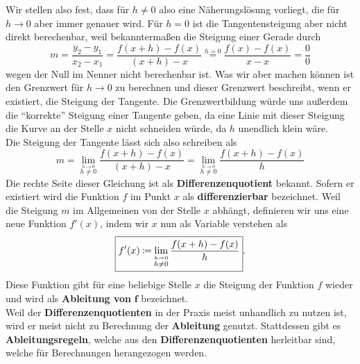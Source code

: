 \documentclass[../../main.tex]{subfiles}
\begin{document}
    Wir stellen also fest, dass für $h\neq 0$ also eine Näherungslösung vorliegt, die für $h\to 0$ aber immer genauer wird. Für $h=0$ ist die Tangentensteigung aber nicht direkt berechenbar, weil bekanntermaßen die Steigung einer Gerade durch
    \[m = \frac{y_2 - y_1}{x_2 - x_1} = \frac{f(x+h) - f(x)}{(x+h)-x} \stackrel{h=0}{=} \frac{f(x) - f(x)}{x-x} = \frac{0}{0}\]
    wegen der Null im Nenner nicht berechenbar ist. Was wir aber machen können ist den Grenzwert für $h\to 0$ zu berechnen und dieser Grenzwert beschreibt, wenn er existiert, die Steigung der Tangente. Die Grenzwertbildung würde uns außerdem die \enquote{korrekte} Steigung einer Tangente geben, da eine Linie mit dieser Steigung die Kurve an der Stelle $x$ nicht schneiden würde, da $h$ unendlich klein wäre.\\
    Die Steigung der Tangente lässt sich also schreiben als
    \[m = \lim\limits_{\stackrel{h\to 0}{h\neq 0}} \frac{f(x+h) - f(x)}{(x+h) - x} = \lim\limits_{\stackrel{h\to 0}{h\neq 0}} \frac{f(x+h) - f(x)}{h}\]
    Die rechte Seite dieser Gleichung ist als \textbf{Differenzenquotient} bekannt. Sofern er existiert wird die Funktion $f$ im Punkt $x$ als \textbf{differenzierbar} bezeichnet. Weil die Steigung $m$ im Allgemeinen von der Stelle $x$ abhängt, definieren wir uns eine neue Funktion $f'(x)$, indem wir $x$ nun als Variable verstehen als
    \[\boxed{f'(x) \mathbin{\coloneqq} \lim\limits_{\stackrel{h\to 0}{h\neq 0}} \frac{f(x+h) - f(x)}{h}}.\]
    Diese Funktion gibt für eine beliebige Stelle $x$ die Steigung der Funktion $f$ wieder und wird als \textbf{Ableitung von} $\boldsymbol{f}$ bezeichnet.\\
    Weil der \textbf{Differenzenquotienten} in der Praxis meist unhandlich zu nutzen ist, wird er meist nicht zu Berechnung der \textbf{Ableitung} genutzt. Stattdessen gibt es \textbf{Ableitungsregeln}, welche aus den \textbf{Differenzenquotienten} herleitbar sind, welche für Berechnungen herangezogen werden.\\
    
\end{document}
